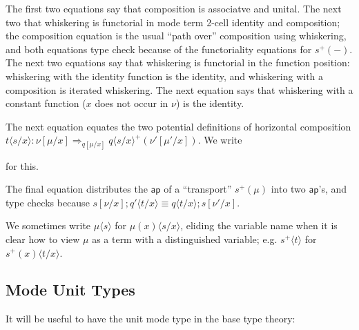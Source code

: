 \documentclass[10pt]{article}
\theoremstyle{definition}
\newcommand{\yields}{\vdash}
\newcommand{\tcell}{\Rightarrow}
\newcommand{\type}{\,\,\mathsf{mode}}
\newcommand{\mt}[0]{\ensuremath{()}}
\newcommand{\id}{\mathsf{id}}
\newcommand\TermTwoT[5]{\ensuremath{#1 \vdash {#2} : #3 \tcell_{#5} #4}}
\newcommand\TrPlus[2]{\ensuremath{{#1}^+(#2)}}
\newcommand\ap[2]{\ensuremath{#1 \langle #2 \rangle }}
\newcommand\ApPlus[2]{\ensuremath{{#1}^+ \langle #2 \rangle }}
\begin{document}
The first two equations say that composition is associatve and unital.
The next two that whiskering is functorial in mode term 2-cell identity
and composition; the composition equation is the usual ``path over''
composition using whiskering, and both equations type check because of
the functoriality equations for $\TrPlus{s}{-}$.  The next two equations
say that whiskering is functorial in the function position: whiskering
with the identity function is the identity, and whiskering with a
composition is iterated whiskering.  The next equation says that
whiskering with a constant function ($x$ does not occur in $\nu$) is the
identity.

The next equation equates the two potential definitions of horizontal
composition $\ap t {s/x} : \nu[\mu/x] \tcell_{q[\mu/x]}
\TrPlus{\ap{q}{s/x}}{\nu'[\mu'/x]}$.  We write
for this.

The final equation distributes the $\mathsf{ap}$ of a ``transport'' 
$\TrPlus{s}{\mu}$ into two $\mathsf{ap}$'s, and type checks because 
$s[\nu/x];\ap{q'}{t/x} \equiv \ap{q}{t/x};s[\nu'/x]$.  

We sometimes write \ap{\mu}{s} for \ap{\mu(x)}{s/x}, eliding the
variable name when it is clear how to view $\mu$ as a term with a
distinguished variable; e.g. $\ApPlus{s}{t}$ for
$\ap{\TrPlus{s}{x}}{t/x}$.  

\subsection{Mode Unit Types}

It will be useful to have the unit mode type in the base type theory:

\end{document}
